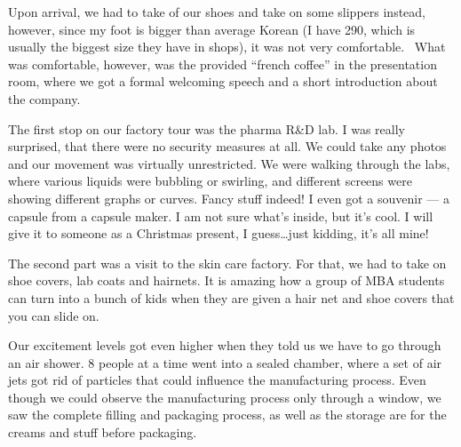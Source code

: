 \begin{post}
\begin{content}
Upon arrival, we had to take of our shoes and take on some slippers instead, however, since my foot is bigger than average Korean (I have 290, which is usually the biggest size they have in shops), it was not very comfortable.  What was comfortable, however, was the provided ``french coffee'' in the presentation room, where we got a formal welcoming speech and a short introduction about the company.


The first stop on our factory tour was the pharma R\&D lab. I was really surprised, that there were no security measures at all. We could take any photos and our movement was virtually unrestricted. We were walking through the labs, where various liquids were bubbling or swirling, and different screens were showing different graphs or curves. Fancy stuff indeed! I even got a souvenir --- a capsule from a capsule maker. I am not sure what's inside, but it's cool. I will give it to someone as a Christmas present, I guess{\ldots}just kidding, it's all mine!


The second part was a visit to the skin care factory. For that, we had to take on shoe covers, lab coats and hairnets. It is amazing how a group of MBA students can turn into a bunch of kids when they are given a hair net and shoe covers that you can slide on.


Our excitement levels got even higher when they told us we have to go through an air shower. 8 people at a time went into a sealed chamber, where a set of air jets got rid of particles that could influence the manufacturing process. Even though we could observe the manufacturing process only through a window, we saw the complete filling and packaging process, as well as the storage are for the creams and stuff before packaging.


\end{content}
\end{post}
